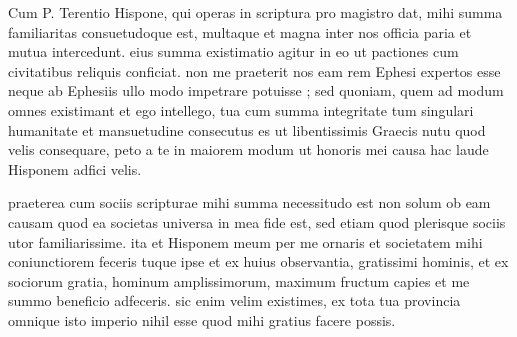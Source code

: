 


 Cum P. Terentio Hispone, qui operas in scriptura pro magistro dat, mihi summa familiaritas consuetudoque est, multaque et magna inter nos officia paria et mutua intercedunt. eius summa existimatio agitur in eo ut pactiones cum civitatibus reliquis conficiat. non me praeterit nos eam rem Ephesi expertos esse neque ab Ephesiis ullo modo impetrare potuisse ; sed quoniam, quem ad modum omnes existimant et ego intellego, tua cum summa integritate tum singulari humanitate et mansuetudine consecutus es ut libentissimis Graecis nutu quod velis consequare, peto a te in maiorem modum ut honoris mei causa hac laude Hisponem adfici velis.

 praeterea cum sociis scripturae mihi summa necessitudo est non solum ob eam causam quod ea societas universa in mea fide est, sed etiam quod plerisque sociis utor familiarissime. ita et Hisponem meum per me ornaris et societatem mihi coniunctiorem feceris tuque ipse et ex huius observantia, gratissimi hominis, et ex sociorum gratia, hominum amplissimorum, maximum fructum capies et me summo beneficio adfeceris. sic enim velim existimes, ex tota tua provincia omnique isto imperio nihil esse quod mihi gratius facere possis.
